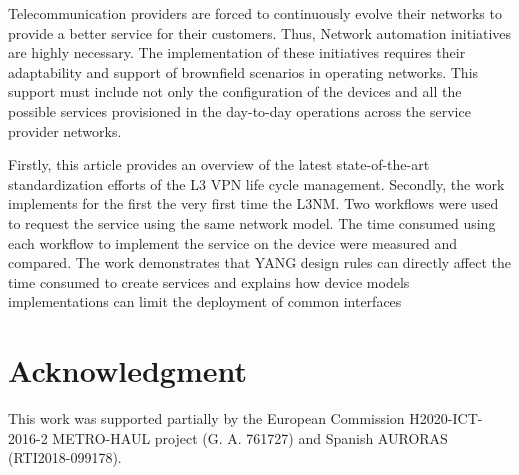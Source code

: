 \documentclass[conference]{IEEEtran}
\begin{document}
Telecommunication providers are forced to continuously evolve their networks to provide a better service for their customers. Thus, Network automation initiatives are highly necessary.  The implementation of these initiatives requires their adaptability and support of brownfield scenarios in operating networks. This support must include not only the configuration of the devices and all the possible services provisioned in the day-to-day operations across the service provider networks. 

Firstly, this article provides an overview of the latest state-of-the-art standardization efforts of the L3 VPN life cycle management. Secondly, the work implements for the first the very first time the L3NM. Two workflows were used to request the service using the same network model. The time consumed using each workflow to implement the service on the device were measured and compared. The work demonstrates that YANG design rules can directly affect the time consumed to create services and explains how device models implementations can limit the deployment of common interfaces

\section*{Acknowledgment}
This work was supported partially by the European Commission H2020-ICT-2016-2 METRO-HAUL project (G. A. 761727) and Spanish AURORAS (RTI2018-099178).



\end{document}

